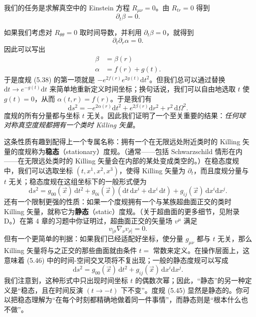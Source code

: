 我们的任务是求解真空中的 Einstein 方程 $R_{\mu\nu} = 0$。由 $R_{tr} = 0$ 得到
\begin{equation*}
\partial_t\beta = 0.
\tag{5.42}
\end{equation*}

如果我们考虑对 $R_{\theta\theta} = 0$ 取时间导数，并利用 $\partial_t\beta = 0$，就得到
\begin{equation*}
\partial_t\partial_r\alpha = 0.
\tag{5.43}
\end{equation*}
因此可以写出
\begin{align*}
\beta &= \beta(r)\\
\alpha &= f(r) + g(t).
\tag{5.44}
\end{align*}
于是度规 (5.38) 的第一项就是 $-e^{2f(r)}e^{2g(t)}\mathrm{d}t^2$。但我们总可以通过替换 $\mathrm{d}t \to e^{-g(t)}\mathrm{d}t$ 来简单地重新定义时间坐标；换句话说，我们可以自由地选取 $t$ 使 $g(t) = 0$，从而 $\alpha(t, r) = f(r)$。于是我们有
\begin{equation*}
\mathrm{d}s^2 = -e^{2\alpha(r)}\mathrm{d}t^2 + e^{2\beta(r)}\mathrm{d}r^2 + r^2\,\mathrm{d}\Omega^2.
\tag{5.45}
\end{equation*}
度规的所有分量都与坐标 $t$ 无关。因此我们证明了一个至关重要的结果：\emph{任何球对称真空度规都拥有一个类时 Killing 矢量}。

这条性质有趣到配得上一个专属名称：拥有一个在无限远处附近类时的 Killing 矢量的度规称为\textbf{稳态}（stationary）度规。（通常——包括 Schwarzschild 情形在内——在无限远处类时的 Killing 矢量会在内部的某处变成类空的。）在稳态度规中，我们可以选取坐标 $(t, x^1, x^2, x^3)$，使得 Killing 矢量为 $\partial_t$，而且度规分量与 $t$ 无关；稳态度规在这组坐标下的一般形式便为
\begin{equation*}
\mathrm{d}s^2 = g_{00}(\vec{x})\,\mathrm{d}t^2 + g_{0i}(\vec{x})(\mathrm{d}t\,\mathrm{d}x^i + \mathrm{d}x^i\,\mathrm{d}t) + g_{ij}(\vec{x})\,\mathrm{d}x^i\mathrm{d}x^j.
\tag{5.46}
\end{equation*}
还有一个限制更强的性质：如果一个度规拥有一个与某族超曲面正交的类时 Killing 矢量，就称它为\textbf{静态}（static）度规。（关于超曲面的更多细节，见附录 D。）在第 4 章的习题中你证明过，超曲面正交的矢量场 $v^\mu$ 满足
\begin{equation*}
v_{[\mu}\nabla_\nu v_{\rho]} = 0.
\tag{5.47}
\end{equation*}
但有一个更简单的判据：如果我们已经适配好坐标，使分量 $g_{\mu\nu}$ 都与 $t$ 无关，那么 Killing 矢量将与之正交的那些曲面就由条件 $t = $ 常数来定义。在操作层面上，这意味着 (5.46) 中的时间-空间交叉项将不复出现；一般的静态度规可以写成
\begin{equation*}
\mathrm{d}s^2 = g_{00}(\vec{x})\,\mathrm{d}t^2 + g_{ij}(\vec{x})\,\mathrm{d}x^i\mathrm{d}x^j.
\tag{5.48}
\end{equation*}
我们注意到，这种形式中只出现时间坐标 $t$ 的偶数次幂；因此，“静态”的另一种定义是“稳态，且在时间反演 $(t \to -t)$ 下不变”。度规 (5.45) 显然是静态的。你可以把稳态理解为“在每个时刻都精确地做着同一件事情”，而静态则是“根本什么也不做”。

